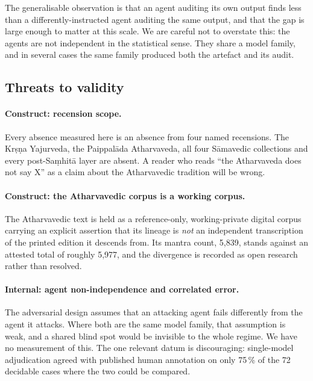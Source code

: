 The generalisable observation is that an agent auditing its own output finds less
than a differently-instructed agent auditing the same output, and that the gap is
large enough to matter at this scale. We are careful not to overstate this: the
agents are not independent in the statistical sense. They share a model family, and
in several cases the same family produced both the artefact and its audit.

\subsection{Threats to validity}
\label{sec:threats}

\paragraph{Construct: recension scope.} Every absence measured here is an absence
from four named recensions. The Kr\d{s}\d{n}a Yajurveda, the Paippal\=ada
Atharvaveda, all four S\=amavedic  collections and every post-Sa\d{m}hit\=a
layer are absent. A reader who reads ``the Atharvaveda does not say X'' as a claim
about the Atharvavedic tradition will be wrong.

\paragraph{Construct: the Atharvavedic corpus is a working corpus.} The Atharvavedic
text is held as a reference-only, working-private digital corpus carrying an explicit
assertion that its lineage is \emph{not} an independent transcription of the printed
edition it descends from. Its mantra count, 5{,}839, stands against an attested total
of roughly 5{,}977, and the divergence is recorded as open research rather than
resolved.

\paragraph{Internal: agent non-independence and correlated error.} The adversarial
design assumes that an attacking agent fails differently from the agent it attacks.
Where both are the same model family, that assumption is weak, and a shared blind
spot would be invisible to the whole regime. We have no measurement of this. The one
relevant datum is discouraging: single-model adjudication agreed with published human
annotation on only 75\,\% of the 72 decidable cases where the two could be compared.

